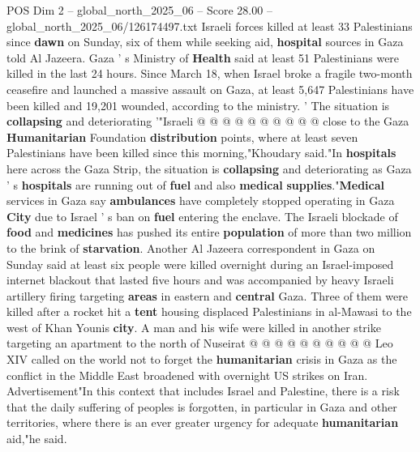 \begin{textsample}{POS Dim 2 – global\_north\_2025\_06 – Score 28.00 – global\_north\_2025\_06/126174497.txt}
Israeli forces killed at least 33 Palestinians since \textbf{dawn} on Sunday, six of them while seeking aid, \textbf{hospital} sources in Gaza told Al Jazeera.
Gaza ' s Ministry of \textbf{Health} said at least 51 Palestinians were killed in the last 24 hours.
Since March 18, when Israel broke a fragile two-month ceasefire and launched a massive assault on Gaza, at least 5,647 Palestinians have been killed and 19,201 wounded, according to the ministry. ' The situation is \textbf{collapsing} and deteriorating '"Israeli @ @ @ @ @ @ @ @ @ @ close to the Gaza \textbf{Humanitarian} Foundation \textbf{distribution} points, where at least seven Palestinians have been killed since this morning,"Khoudary said."In \textbf{hospitals} here across the Gaza Strip, the situation is \textbf{collapsing} and deteriorating as Gaza ' s \textbf{hospitals} are running out of \textbf{fuel} and also \textbf{medical} \textbf{supplies}."\textbf{Medical} services in Gaza say \textbf{ambulances} have completely stopped operating in Gaza \textbf{City} due to Israel ' s ban on \textbf{fuel} entering the enclave.
The Israeli blockade of \textbf{food} and \textbf{medicines} has pushed its entire \textbf{population} of more than two million to the brink of \textbf{starvation}.
Another Al Jazeera correspondent in Gaza on Sunday said at least six people were killed overnight during an Israel-imposed internet blackout that lasted five hours and was accompanied by heavy Israeli artillery firing targeting \textbf{areas} in eastern and \textbf{central} Gaza.
Three of them were killed after a rocket hit a \textbf{tent} housing displaced Palestinians in al-Mawasi to the west of Khan Younis \textbf{city}.
A man and his wife were killed in another strike targeting an apartment to the north of Nuseirat @ @ @ @ @ @ @ @ @ @ Leo XIV called on the world not to forget the \textbf{humanitarian} crisis in Gaza as the conflict in the Middle East broadened with overnight US strikes on Iran.
Advertisement"In this context that includes Israel and Palestine, there is a risk that the daily suffering of peoples is forgotten, in particular in Gaza and other territories, where there is an ever greater urgency for adequate \textbf{humanitarian} aid,"he said.

\end{textsample}
